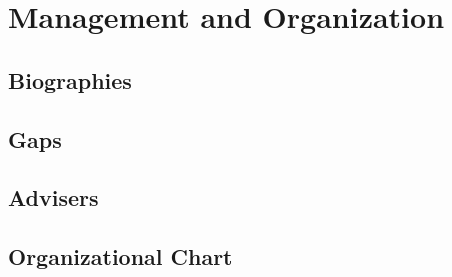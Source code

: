 \section{Management and Organization}
\subsection{Biographies}
\subsection{Gaps}
\subsection{Advisers}
\subsection{Organizational Chart}
